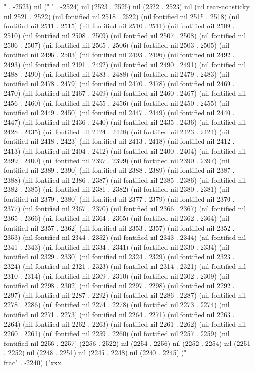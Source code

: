 " . -2523) nil (" " . -2524) nil (2523 . 2525) nil (2522 . 2523) nil (nil rear-nonsticky nil 2521 . 2522) (nil fontified nil 2518 . 2522) (nil fontified nil 2515 . 2518) (nil fontified nil 2511 . 2515) (nil fontified nil 2510 . 2511) (nil fontified nil 2509 . 2510) (nil fontified nil 2508 . 2509) (nil fontified nil 2507 . 2508) (nil fontified nil 2506 . 2507) (nil fontified nil 2505 . 2506) (nil fontified nil 2503 . 2505) (nil fontified nil 2496 . 2503) (nil fontified nil 2493 . 2496) (nil fontified nil 2492 . 2493) (nil fontified nil 2491 . 2492) (nil fontified nil 2490 . 2491) (nil fontified nil 2488 . 2490) (nil fontified nil 2483 . 2488) (nil fontified nil 2479 . 2483) (nil fontified nil 2478 . 2479) (nil fontified nil 2470 . 2478) (nil fontified nil 2469 . 2470) (nil fontified nil 2467 . 2469) (nil fontified nil 2460 . 2467) (nil fontified nil 2456 . 2460) (nil fontified nil 2455 . 2456) (nil fontified nil 2450 . 2455) (nil fontified nil 2449 . 2450) (nil fontified nil 2447 . 2449) (nil fontified nil 2440 . 2447) (nil fontified nil 2436 . 2440) (nil fontified nil 2435 . 2436) (nil fontified nil 2428 . 2435) (nil fontified nil 2424 . 2428) (nil fontified nil 2423 . 2424) (nil fontified nil 2418 . 2423) (nil fontified nil 2413 . 2418) (nil fontified nil 2412 . 2413) (nil fontified nil 2404 . 2412) (nil fontified nil 2400 . 2404) (nil fontified nil 2399 . 2400) (nil fontified nil 2397 . 2399) (nil fontified nil 2390 . 2397) (nil fontified nil 2389 . 2390) (nil fontified nil 2388 . 2389) (nil fontified nil 2387 . 2388) (nil fontified nil 2386 . 2387) (nil fontified nil 2385 . 2386) (nil fontified nil 2382 . 2385) (nil fontified nil 2381 . 2382) (nil fontified nil 2380 . 2381) (nil fontified nil 2379 . 2380) (nil fontified nil 2377 . 2379) (nil fontified nil 2370 . 2377) (nil fontified nil 2367 . 2370) (nil fontified nil 2366 . 2367) (nil fontified nil 2365 . 2366) (nil fontified nil 2364 . 2365) (nil fontified nil 2362 . 2364) (nil fontified nil 2357 . 2362) (nil fontified nil 2353 . 2357) (nil fontified nil 2352 . 2353) (nil fontified nil 2344 . 2352) (nil fontified nil 2343 . 2344) (nil fontified nil 2341 . 2343) (nil fontified nil 2334 . 2341) (nil fontified nil 2330 . 2334) (nil fontified nil 2329 . 2330) (nil fontified nil 2324 . 2329) (nil fontified nil 2323 . 2324) (nil fontified nil 2321 . 2323) (nil fontified nil 2314 . 2321) (nil fontified nil 2310 . 2314) (nil fontified nil 2309 . 2310) (nil fontified nil 2302 . 2309) (nil fontified nil 2298 . 2302) (nil fontified nil 2297 . 2298) (nil fontified nil 2292 . 2297) (nil fontified nil 2287 . 2292) (nil fontified nil 2286 . 2287) (nil fontified nil 2278 . 2286) (nil fontified nil 2274 . 2278) (nil fontified nil 2273 . 2274) (nil fontified nil 2271 . 2273) (nil fontified nil 2264 . 2271) (nil fontified nil 2263 . 2264) (nil fontified nil 2262 . 2263) (nil fontified nil 2261 . 2262) (nil fontified nil 2260 . 2261) (nil fontified nil 2259 . 2260) (nil fontified nil 2257 . 2259) (nil fontified nil 2256 . 2257) (2256 . 2522) nil (2254 . 2256) nil (2252 . 2254) nil (2251 . 2252) nil (2248 . 2251) nil (2245 . 2248) nil (2240 . 2245) ("\\frac" . -2240) ("xxx
